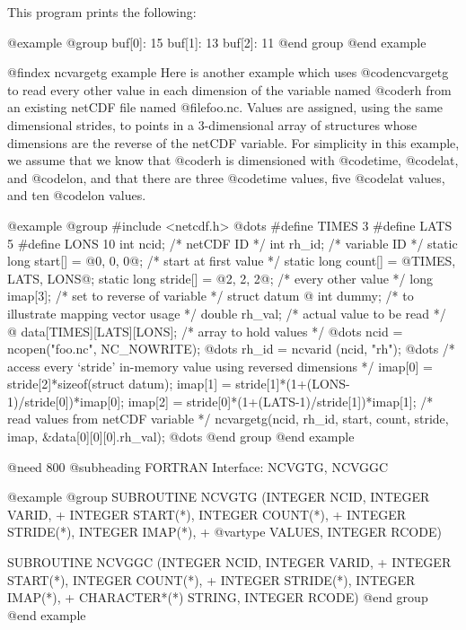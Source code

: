 This program prints the following:

@example
@group
buf[0]: 15
buf[1]: 13
buf[2]: 11
@end group
@end example

@findex ncvargetg example
Here is another example which uses @code{ncvargetg} to read every other value in
each dimension of the variable named @code{rh} from an existing netCDF
file named @file{foo.nc}.  Values are assigned, using the same
dimensional strides, to points in a 3-dimensional array of structures
whose dimensions are the reverse of the netCDF variable.  For simplicity
in this example, we assume that we know that @code{rh} is dimensioned
with @code{time}, @code{lat}, and @code{lon}, and that there are three
@code{time} values, five @code{lat} values, and ten @code{lon} values.

@example
@group
#include <netcdf.h>
   @dots{}
#define TIMES 3
#define LATS  5
#define LONS 10
int ncid;                           /* netCDF ID */
int rh_id;                          /* variable ID */
static long start[] = @{0, 0, 0@};  /* start at first value */
static long count[] = @{TIMES, LATS, LONS@};
static long stride[] = @{2, 2, 2@}; /* every other value */
long imap[3];                       /* set to reverse of variable */
struct datum @{
    int dummy;                      /* to illustrate mapping vector usage */
    double rh_val;                  /* actual value to be read */
@}      data[TIMES][LATS][LONS];    /* array to hold values */
   @dots{}
   ncid = ncopen("foo.nc", NC_NOWRITE);
   @dots{}
   rh_id = ncvarid (ncid, "rh");
   @dots{}
   /* access every `stride' in-memory value using reversed dimensions */
   imap[0] = stride[2]*sizeof(struct datum);
   imap[1] = stride[1]*(1+(LONS-1)/stride[0])*imap[0];
   imap[2] = stride[0]*(1+(LATS-1)/stride[1])*imap[1];
   /* read values from netCDF variable */
   ncvargetg(ncid, rh_id, start, count, stride, imap, &data[0][0][0].rh_val);
   @dots{}
@end group
@end example

@need 800
@subheading FORTRAN Interface:  NCVGTG, NCVGGC

@example
@group
      SUBROUTINE NCVGTG (INTEGER NCID, INTEGER VARID,
     + INTEGER START(*), INTEGER COUNT(*),
     + INTEGER STRIDE(*), INTEGER IMAP(*),
     + @var{type} VALUES, INTEGER RCODE)

      SUBROUTINE NCVGGC (INTEGER NCID, INTEGER VARID,
     + INTEGER START(*), INTEGER COUNT(*),
     + INTEGER STRIDE(*), INTEGER IMAP(*),
     + CHARACTER*(*) STRING, INTEGER RCODE)
@end group
@end example

